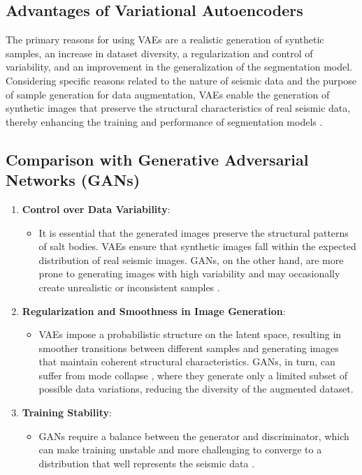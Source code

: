 \documentclass{ieeeaccess}
\begin{document}
\subsection*{Advantages of Variational Autoencoders}
The primary reasons for using VAEs are a realistic generation of synthetic samples, an increase in dataset diversity, a regularization and control of variability, and an improvement in the generalization of the segmentation model. Considering specific reasons related to the nature of seismic data and the purpose of sample generation for data augmentation, VAEs enable the generation of synthetic images that preserve the structural characteristics of real seismic data, thereby enhancing the training and performance of segmentation models \cite{ref1} \cite{ref15} \cite{ref18}.

\subsection*{Comparison with Generative Adversarial Networks (GANs)}

\begin{enumerate}
    \item \textbf{Control over Data Variability}:
    \begin{itemize}
        \item It is essential that the generated images preserve the structural patterns of salt bodies. VAEs ensure that synthetic images fall within the expected distribution of real seismic images. GANs, on the other hand, are more prone to generating images with high variability and may occasionally create unrealistic or inconsistent samples \cite{ref16}.
    \end{itemize}
    \item \textbf{Regularization and Smoothness in Image Generation}:
    \begin{itemize}
        \item VAEs impose a probabilistic structure on the latent space, resulting in smoother transitions between different samples and generating images that maintain coherent structural characteristics. GANs, in turn, can suffer from mode collapse \cite{ref16}, where they generate only a limited subset of possible data variations, reducing the diversity of the augmented dataset.
    \end{itemize}
    \item \textbf{Training Stability}:
    \begin{itemize}
        \item GANs require a balance between the generator and discriminator, which can make training unstable and more challenging to converge to a distribution that well represents the seismic data \cite{ref16}.
    \end{itemize}
\end{enumerate}
\end{document}
